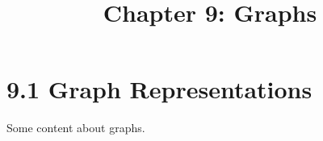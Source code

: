 \documentclass{article}
\title{Chapter 9: Graphs}
\begin{document}
\section{9.1 Graph Representations}
Some content about graphs.
\end{document}
